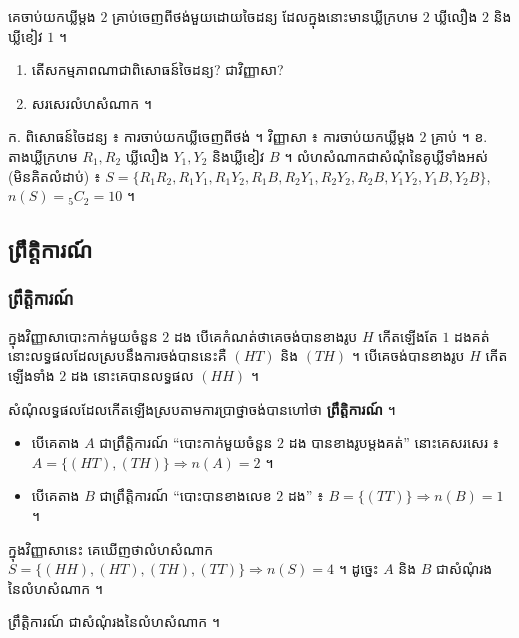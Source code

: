 \begin{pro}
គេចាប់យកឃ្លីម្ដង $2$ គ្រាប់ចេញពីថង់មួយដោយចៃដន្យ ដែលក្នុងនោះមានឃ្លីក្រហម $2$ ឃ្លីលឿង $2$ និងឃ្លីខៀវ $1$ ។
\begin{enumerate}[a]
  \item តើសកម្មភាពណាជាពិសោធន៍ចៃដន្យ? ជាវិញ្ញាសា?
  \item សរសេរលំហសំណាក ។
\end{enumerate}
\ans
ក. ពិសោធន៍ចៃដន្យ ៖ ការចាប់យកឃ្លីចេញពីថង់ ។ វិញ្ញាសា ៖ ការចាប់យកឃ្លីម្ដង $2$ គ្រាប់ ។ \quad ខ. តាងឃ្លីក្រហម $R_1, R_2$ ឃ្លីលឿង $Y_1, Y_2$ និងឃ្លីខៀវ $B$ ។ លំហសំណាកជាសំណុំនៃគូឃ្លីទាំងអស់ (មិនគិតលំដាប់) ៖ $S = \{R_1R_2, R_1Y_1, R_1Y_2, R_1B, R_2Y_1, R_2Y_2, R_2B, Y_1Y_2, Y_1B, Y_2B\}$, $n(S) = {}_5C_2 = 10$ ។
\end{pro}

\subsection{ព្រឹត្តិការណ៍}
\subsubsection{ព្រឹត្តិការណ៍}

\begin{example}[ឧទាហរណ៍ ១]
ក្នុងវិញ្ញាសាបោះកាក់មួយចំនួន $2$ ដង បើគេកំណត់ថាគេចង់បានខាងរូប $H$ កើតឡើងតែ $1$ ដងគត់ នោះលទ្ធផលដែលស្របនឹងការចង់បាននេះគឺ $(HT)$ និង $(TH)$ ។ បើគេចង់បានខាងរូប $H$ កើតឡើងទាំង $2$ ដង នោះគេបានលទ្ធផល $(HH)$ ។
\end{example}
សំណុំលទ្ធផលដែលកើតឡើងស្របតាមការប្រាថ្នាចង់បានហៅថា \textbf{ព្រឹត្តិការណ៍} ។
\begin{itemize}
  \item បើគេតាង $A$ ជាព្រឹត្តិការណ៍ “បោះកាក់មួយចំនួន $2$ ដង បានខាងរូបម្ដងគត់” នោះគេសរសេរ ៖ $A = \{(HT), (TH)\} \Rightarrow n(A) = 2$ ។
  \item បើគេតាង $B$ ជាព្រឹត្តិការណ៍ “បោះបានខាងលេខ $2$ ដង” ៖ $B = \{(TT)\} \Rightarrow n(B) = 1$ ។
\end{itemize}
ក្នុងវិញ្ញាសានេះ គេឃើញថាលំហសំណាក $S = \{(HH), (HT), (TH), (TT)\} \Rightarrow n(S) = 4$ ។ ដូច្នេះ $A$ និង $B$ ជាសំណុំរងនៃលំហសំណាក ។

\begin{note}[សម្គាល់]
ព្រឹត្តិការណ៍ ជាសំណុំរងនៃលំហសំណាក ។
\end{note}

